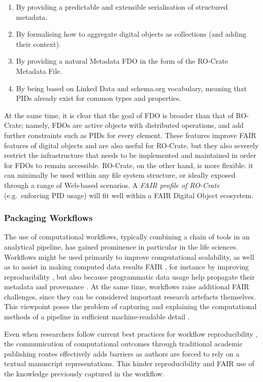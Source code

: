 \begin{enumerate}
\item
  By providing a predictable and extensible serialisation of structured
  metadata.
\item
  By formalising how to aggregate digital objects as collections (and
  adding their context).
\item
  By providing a natural Metadata FDO in the form of the RO-Crate
  Metadata File.
\item
  By being based on Linked Data and schema.org vocabulary, meaning that
  PIDs already exist for common types and properties.
\end{enumerate}

At the same time, it is clear that the goal of FDO is broader than that
of RO-Crate; namely, FDOs are active objects with distributed
operations, and add further constraints such as PIDs for every element.
These features improve FAIR features of digital objects and are also
useful for RO-Crate, but they also severely restrict the infrastructure
that needs to be implemented and maintained in order for FDOs to remain
accessible. RO-Crate, on the other hand, is more flexible: it can
minimally be used within any file system structure, or ideally exposed
through a range of Web-based scenarios. A \emph{FAIR profile of
RO-Crate} (e.g.~enforcing PID usage) will fit well within a FAIR Digital
Object ecosystem.

\subsubsection{Packaging Workflows}\label{ch5:packaging-workflows}

The use of computational workflows, typically combining a chain of tools
in an analytical pipeline, has gained prominence in particular in the
life sciences. Workflows might be used primarily to improve
computational scalability, as well as to assist in making computed data
results FAIR \cite{Goble 2020}, for
instance by improving reproducibility
\cite{Cohen-Boulakia 2017}, but also
because programmatic data usage help propagate their metadata and
provenance \cite{ch5-69}. At the
same time, workflows raise additional FAIR challenges, since they can be
considered important research artefacts themselves. This viewpoint poses
the problem of capturing and explaining the computational methods of a
pipeline in sufficient machine-readable detail
\cite{Lamprecht 2019}.

Even when researchers follow current best practices for workflow
reproducibility
\cite{Gruning 2018b,Cohen-Boulakia 2017}, the
communication of computational outcomes through traditional academic
publishing routes effectively adds barriers as authors are forced to
rely on a textual manuscript representations. This hinder
reproducibility and FAIR use of the knowledge previously captured in the
workflow.

